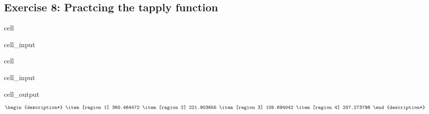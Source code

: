\documentclass[letterpaper,10pt,english]{jupyterBook}
\begin{document}
\subsection{Exercise 8: Practcing the tapply function}
\label{\detokenize{exercises_unit_3:exercise-8-practcing-the-tapply-function}}
\begin{sphinxuseclass}{cell}\begin{sphinxVerbatimInput}

\begin{sphinxuseclass}{cell_input}
\begin{sphinxVerbatim}[commandchars=\\\{\}]

\end{sphinxVerbatim}

\end{sphinxuseclass}\end{sphinxVerbatimInput}

\end{sphinxuseclass}
\begin{sphinxuseclass}{cell}\begin{sphinxVerbatimInput}

\begin{sphinxuseclass}{cell_input}
\begin{sphinxVerbatim}[commandchars=\\\{\}]
\end{sphinxVerbatim}

\end{sphinxuseclass}\end{sphinxVerbatimInput}
\begin{sphinxVerbatimOutput}

\begin{sphinxuseclass}{cell_output}\begin{equation*}
\begin{split}\begin{description*}
\item[region 1] 360.464472
\item[region 2] 221.903655
\item[region 3] 105.694042
\item[region 4] 207.273796
\end{description*}\end{split}
\end{equation*}
\end{sphinxuseclass}\end{sphinxVerbatimOutput}

\end{sphinxuseclass}
\end{document}
